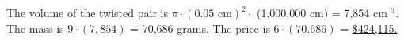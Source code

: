The volume of the twisted pair is $\pi \cdot (0.05 \text{ cm})^2 \cdot $ (1,000,000 cm) = 7,854 cm $^3$. The mass is $9 \cdot (7,854)$ = 70,686 grams. The price is $6 \cdot (70.686)$ = \ul{\$424,115.}




